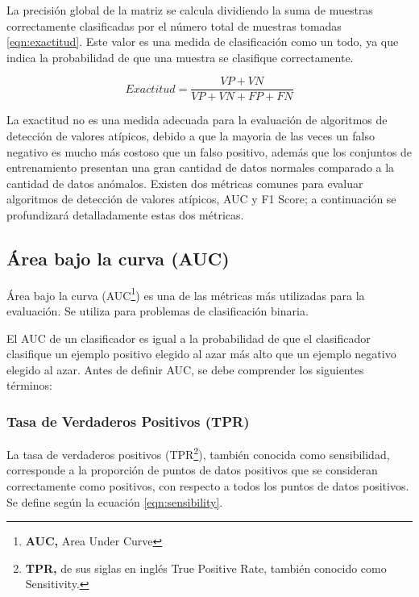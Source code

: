 \vspace{5mm} %

La precisi\'{o}n global de la matriz se calcula dividiendo la suma de muestras correctamente clasificadas por el n\'{u}mero total de muestras tomadas \ref{eqn:exactitud}. Este valor es una medida de clasificaci\'{o}n como un todo, ya que indica la probabilidad de que una muestra se clasifique correctamente.

\begin{equation}
Exactitud=\frac{VP+VN}{VP+VN+FP+FN}
\label{eqn:exactitud}
\end{equation}

La exactitud no es una medida adecuada para la evaluaci\'{o}n de algoritmos de detecci\'{o}n de valores at\'{i}picos, debido a que la mayoria de las veces un falso negativo es mucho m\'{a}s costoso que un falso positivo, adem\'{a}s que los conjuntos de entrenamiento presentan una gran cantidad de datos normales comparado a la cantidad de datos an\'{o}malos. Existen dos m\'{e}tricas comunes para evaluar algoritmos de detecci\'{o}n de valores at\'{i}picos, AUC y F1 Score; a continuaci\'{o}n se profundizar\'{a} detalladamente estas dos m\'{e}tricas.

\subsection{\'{A}rea bajo la curva (AUC)}

\'{A}rea bajo la curva (AUC\footnote{\textbf{AUC, }Area Under Curve}) es una de las m\'{e}tricas m\'{a}s utilizadas para la evaluaci\'{o}n. Se utiliza para problemas de clasificaci\'{o}n binaria.

\vspace{5mm} %

El AUC de un clasificador es igual a la probabilidad de que el clasificador clasifique un ejemplo positivo elegido al azar m\'{a}s alto que un ejemplo negativo elegido al azar. Antes de definir AUC, se debe comprender los siguientes t\'{e}rminos:

\subsubsection{Tasa de Verdaderos Positivos (TPR)}

La tasa de verdaderos positivos (TPR\footnote{\textbf{TPR, }de sus siglas en ingl\'{e}s True Positive Rate, tambi\'{e}n conocido como Sensitivity.}), tambi\'{e}n conocida como sensibilidad, corresponde a la proporción de puntos de datos positivos que se consideran correctamente como positivos, con respecto a todos los puntos de datos positivos. Se define seg\'{u}n la ecuaci\'{o}n \ref{eqn:sensibility}.

